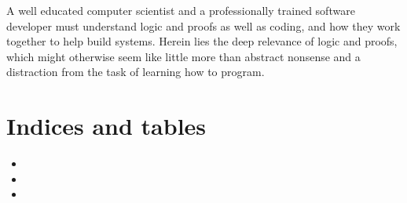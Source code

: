 \documentclass[letterpaper,10pt,english]{sphinxmanual}
\begin{document}
A well educated computer scientist and a professionally trained
software developer must understand logic and proofs as well as coding,
and how they work together to help build  systems. Herein
lies the deep relevance of logic and proofs, which might otherwise
seem like little more than abstract nonsense and a distraction from
the task of learning how to program.


\chapter{Indices and tables}
\label{\detokenize{index:indices-and-tables}}\begin{itemize}
\item {} 

\item {} 

\item {} 

\end{itemize}



\renewcommand{\indexname}{Index}
\printindex
\end{document}
